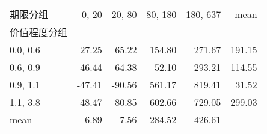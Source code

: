 \begin{tabular}{lrrrrr}
\toprule
期限分组 &  0, 20 &  20, 80 &  80, 180 &  180, 637 &   mean \\
价值程度分组 &          &           &            &             &        \\
\midrule
0.0, 0.6    &    27.25 &     65.22 &     154.80 &      271.67 & 191.15 \\
0.6, 0.9    &    46.44 &     64.38 &      52.10 &      293.21 & 114.55 \\
0.9, 1.1    &   -47.41 &    -90.56 &     561.17 &      819.41 &  31.52 \\
1.1, 3.8    &    48.47 &     80.85 &     602.66 &      729.05 & 299.03 \\
mean          &    -6.89 &      7.56 &     284.52 &      426.61 &        \\
\bottomrule
\end{tabular}
